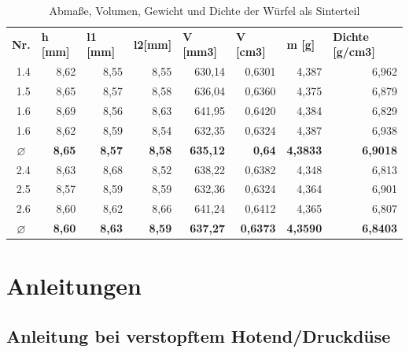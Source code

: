   \FloatBarrier
  \begin{table}[h]
    \centering
    \caption{Abmaße, Volumen, Gewicht und Dichte der Würfel als Sinterteil}
      \begin{tabular}{crrrrrrr}
      \toprule
      \textbf{Nr.} & \multicolumn{1}{l}{\textbf{h [mm]}} & \multicolumn{1}{l}{\textbf{l1 [mm]}} & \multicolumn{1}{l}{\textbf{l2[mm]}} & \multicolumn{1}{l}{\textbf{V [mm3]}} & \multicolumn{1}{l}{\textbf{V [cm3]}} & \multicolumn{1}{l}{\textbf{m [g]}} & \multicolumn{1}{l}{\textbf{Dichte [g/cm3]}} \\
      \multicolumn{1}{r}{1.4} & 8,62 & 8,55 & 8,55  & 630,14 & 0,6301 & 4,387 & 6,962 \\
      \multicolumn{1}{r}{1.5} & 8,65 & 8,57 & 8,58  & 636,04 & 0,6360 & 4,375 & 6,879 \\
      \multicolumn{1}{r}{1.6} & 8,69 & 8,56 & 8,63 & 641,95 & 0,6420 & 4,384  & 6,829 \\
      \multicolumn{1}{r}{1.6} & 8,62 & 8,59 & 8,54 & 632,35 & 0,6324 & 4,387  & 6,938 \\
      \textbf{\textbf{$\varnothing$}} & \textbf{8,65} & \textbf{8,57} & \textbf{8,58} & \textbf{635,12} & \textbf{0,64} & \textbf{4,3833} & \textbf{6,9018} \\
      \midrule
      \multicolumn{1}{r}{2.4} & 8,63  & 8,68 & 8,52 & 638,22 & 0,6382 & 4,348 & 6,813 \\
      \multicolumn{1}{r}{2.5} & 8,57 & 8,59  & 8,59 & 632,36 & 0,6324 & 4,364 & 6,901 \\
      \multicolumn{1}{r}{2.6} & 8,60  & 8,62 & 8,66 & 641,24 & 0,6412 & 4,365 & 6,807 \\
      \textbf{\textbf{$\varnothing$}} & \textbf{8,60} & \textbf{8,63} & \textbf{8,59} & \textbf{637,27} & \textbf{0,6373} & \textbf{4,3590} & \textbf{6,8403} \\
      \bottomrule
      \end{tabular}%
    \label{Sinterteilmaße}%
  \end{table}%
  \FloatBarrier
  
\section{Anleitungen}
\subsection*{Anleitung bei verstopftem Hotend/Druckdüse}

